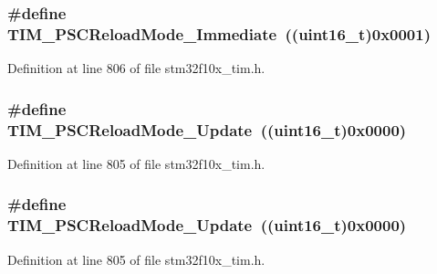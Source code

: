 \subsubsection[{\texorpdfstring{T\+I\+M\+\_\+\+P\+S\+C\+Reload\+Mode\+\_\+\+Immediate}{TIM_PSCReloadMode_Immediate}}]{\setlength{\rightskip}{0pt plus 5cm}\#define T\+I\+M\+\_\+\+P\+S\+C\+Reload\+Mode\+\_\+\+Immediate~(({\bf uint16\+\_\+t})0x0001)}\hypertarget{group___t_i_m___prescaler___reload___mode_ga9ba55481ccdcb64268b7b9f2095bfc17}{}\label{group___t_i_m___prescaler___reload___mode_ga9ba55481ccdcb64268b7b9f2095bfc17}


Definition at line 806 of file stm32f10x\+\_\+tim.\+h.

\subsubsection[{\texorpdfstring{T\+I\+M\+\_\+\+P\+S\+C\+Reload\+Mode\+\_\+\+Update}{TIM_PSCReloadMode_Update}}]{\setlength{\rightskip}{0pt plus 5cm}\#define T\+I\+M\+\_\+\+P\+S\+C\+Reload\+Mode\+\_\+\+Update~(({\bf uint16\+\_\+t})0x0000)}\hypertarget{group___t_i_m___prescaler___reload___mode_gad76dd05a3ae4e44e040e0e083bd460bf}{}\label{group___t_i_m___prescaler___reload___mode_gad76dd05a3ae4e44e040e0e083bd460bf}


Definition at line 805 of file stm32f10x\+\_\+tim.\+h.

\subsubsection[{\texorpdfstring{T\+I\+M\+\_\+\+P\+S\+C\+Reload\+Mode\+\_\+\+Update}{TIM_PSCReloadMode_Update}}]{\setlength{\rightskip}{0pt plus 5cm}\#define T\+I\+M\+\_\+\+P\+S\+C\+Reload\+Mode\+\_\+\+Update~(({\bf uint16\+\_\+t})0x0000)}\hypertarget{group___t_i_m___prescaler___reload___mode_gad76dd05a3ae4e44e040e0e083bd460bf}{}\label{group___t_i_m___prescaler___reload___mode_gad76dd05a3ae4e44e040e0e083bd460bf}


Definition at line 805 of file stm32f10x\+\_\+tim.\+h.


